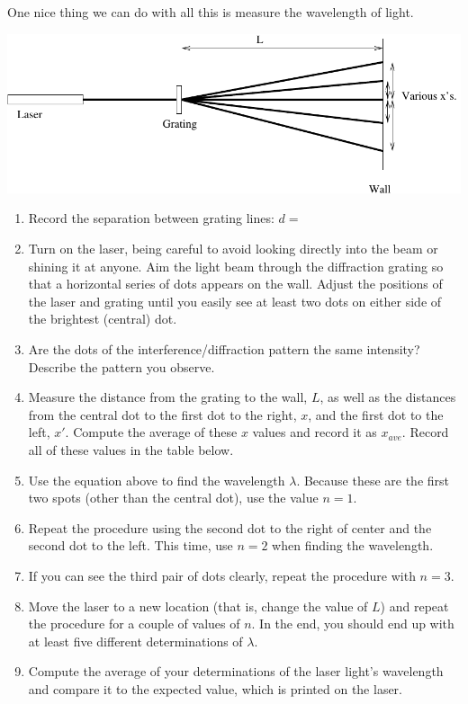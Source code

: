 One nice thing we can do with all this is measure the wavelength of light.

\bigskip
\pagebreak[2]
\centerline{\includegraphics[width=\textwidth]{diffraction/difffig.pdf}}
\bigskip

\begin{enumerate}
\item Record the separation between grating lines: \( d= \)
\item Turn on the laser, being careful to avoid looking directly into the
beam or shining it at anyone. Aim the light beam through the diffraction
grating so that a horizontal series of dots appears on the wall. Adjust
the positions of the laser and grating until you easily see at least
two dots on either side of the brightest (central) dot.
\item Are the dots of the interference/diffraction pattern the same intensity?
Describe the pattern you observe.\answerspace{15mm}

\item Measure the distance from the grating to the wall, $L$,
as well as the distances from the central dot to the first dot to
the right, $x$, and the first dot to the left, $x'$. Compute the average
of these $x$ values and record it as $x_{ave}$. Record all of these
values in the table below.
\item Use the equation above to find the wavelength $\lambda$.
Because these are the first two spots (other than the central dot),
use the value $n=1$.
\item Repeat the procedure using the second dot to the right
of center and the second dot to the left.  This time, use $n=2$ 
when finding the wavelength.
\item If you can see the third pair of dots clearly, repeat the
procedure with $n=3$.
\item Move the laser to a new location (that is, change the
value of $L$) and repeat the procedure for a couple of values
of $n$.  In the end, you should end up with at least
five different determinations of $\lambda$.
\item Compute the average of your determinations of the laser light's
  wavelength and compare it to the expected value, which is printed on the
  laser.
\answerspace{15mm}


\end{enumerate}
